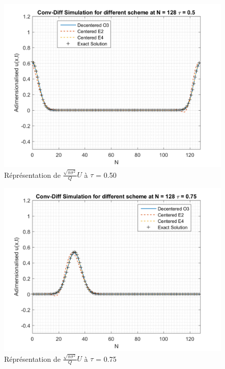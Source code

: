 \documentclass{article}
\begin{document}
\begin{figure}[H]
    \centering
    \includegraphics[scale=0.45]{img/fig5b.png}
    \caption{Réprésentation de $\frac{\sqrt{\pi \sigma^2}}{Q} U$ à $\tau$ = 0.50}
    \label{fig5b}
\end{figure}
\begin{figure}[H]
    \centering
    \includegraphics[scale=0.45]{img/fig5c.png}
    \caption{Réprésentation de $\frac{\sqrt{\pi \sigma^2}}{Q} U$ à $\tau$ = 0.75}
    \label{fig5c}
\end{figure}
\end{document}
